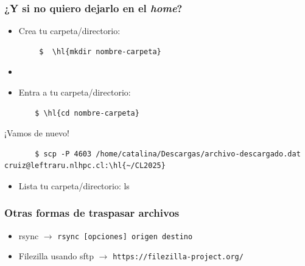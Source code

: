 \documentclass[aspectratio=169,professionalfonts]{beamer}
\begin{document}
\begin{frame}[fragile]
\frametitle{\textbf{¿Y si no quiero dejarlo en el \textit{home}?}}
\begin{itemize}
    \item Crea tu carpeta/directorio:
    \end{itemize}
    \begin{verbatim}
        $  \hl{mkdir nombre-carpeta}
    \end{verbatim}
   \begin{itemize}
       \item  \item Entra a tu carpeta/directorio:
   \end{itemize}
   \begin{verbatim}
       $ \hl{cd nombre-carpeta}
   \end{verbatim}
    ¡Vamos de nuevo!
   \begin{verbatim}
       $ scp -P 4603 /home/catalina/Descargas/archivo-descargado.dat cruiz@leftraru.nlhpc.cl:\hl{~/CL2025}
   \end{verbatim}
   \begin{itemize}
       \item Lista tu carpeta/directorio: ls 
   \end{itemize}
       
\end{frame}

\begin{frame}[fragile]
\frametitle{\textbf{Otras formas de traspasar archivos}}
\begin{itemize}
    \item rsync $\rightarrow$ \texttt{rsync [opciones] origen destino}
    \vspace{0.5em} 
    \item Filezilla usando sftp $\rightarrow$ {\color{blue} \scriptsize \texttt{https://filezilla-project.org/}}
    \end{itemize}
    
\end{frame}
\end{document}
